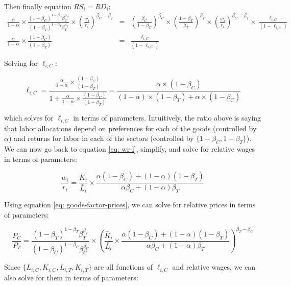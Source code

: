 \documentclass[11pt,letterpaper]{article}
\begin{document}
Then finally equation $RS_i = RD_i$:
\begin{eqnarray*}
    \frac{\alpha}{1-\alpha} \times \frac{ (1-\beta_C)^{1-\beta_C} \beta_C^{\beta_C} }{(1-\beta_T)^{1-\beta_T} \beta_T^{\beta_T}} \times \left(  \frac{w_i}{r_i} \right)^{\beta_C-\beta_T }   &=& \left( \frac{\beta_C}{1-\beta_C} \right)^{\beta_C} \times \left( \frac{1-\beta_T}{\beta_T} \right)^{\beta_T} \times \left( \frac{w_i}{r_i} \right)^{\beta_C-\beta_T}  \times \frac{\ell_{i,C} }{(1-\ell_{i,C})}  \\
    \frac{\alpha}{1-\alpha} \times \frac{ (1-\beta_C)  }{(1-\beta_T) }     &=&    \frac{\ell_{i,C} }{(1-\ell_{i,C})}
\end{eqnarray*}

Solving for $\ell_{i,C}$:

\begin{equation*}
    \ell_{i,C} = \frac{\frac{\alpha}{1-\alpha} \times \frac{ (1-\beta_C)  }{(1-\beta_T) } }{ 1 + \frac{\alpha}{1-\alpha} \times \frac{ (1-\beta_C)  }{(1-\beta_T) } } = \frac{\alpha \times (1-\beta_C)}{(1-\alpha)\times(1-\beta_T)+ \alpha\times(1-\beta_C)}
\end{equation*}

\noindent which solves for $\ell_{i,C}$ in terms of parameters. Intuitively, the ratio above is saying that labor allocations depend on preferences for each of the goods (controlled by $\alpha$) and returns for labor in each of the sectors (controlled by $\{1-\beta_C, 1-\beta_T\}$). We can now go back to equation \eqref{eq: wr-l}, simplify, and solve for relative wages in terms of parameters:


\begin{equation*}
\boxed{
    \frac{w_i}{r_i} = \frac{\bar{K}_i }{\bar{L}_i } \times \frac{\alpha (1-\beta_C) + (1-\alpha)(1-\beta_T)}{\alpha \beta_C + (1-\alpha)\beta_T}
}
\end{equation*}

Using equation \eqref{eq: goods-factor-prices}, we can solve for relative prices in terms of parameters:

\begin{equation*}
\boxed{
     \frac{P_C}{P_T} = \frac{(1-\beta_T)^{1-\beta_T} \beta_T^{\beta_T}}{ (1-\beta_C)^{1-\beta_C} \beta_C^{\beta_C} } \times \left(  \frac{\bar{K}_i }{\bar{L}_i } \times \frac{\alpha (1-\beta_C) + (1-\alpha)(1-\beta_T)}{\alpha \beta_C + (1-\alpha)\beta_T}  \right)^{\beta_T - \beta_C}
}
\end{equation*}

Since $\{L_{i,C}, K_{i,C}, L_{i,T}, K_{i,T}\}$ are all functions of $\ell_{i,C}$ and relative wages, we can also solve for them in terms of parameters:
\end{document}
